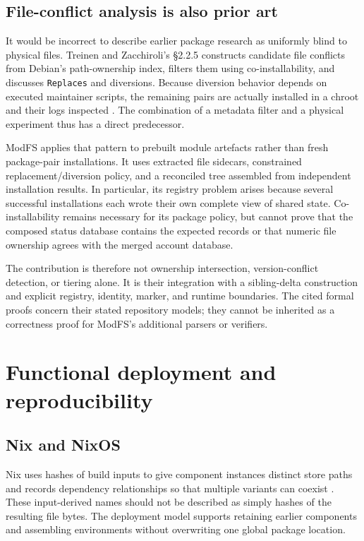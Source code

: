 \subsection{File-conflict analysis is also prior art}

It would be incorrect to describe earlier package research as uniformly blind to physical files. Treinen and Zacchiroli's §2.2.5 constructs candidate file conflicts from Debian's path-ownership index, filters them using co-installability, and discusses \texttt{Replaces} and diversions. Because diversion behavior depends on executed maintainer scripts, the remaining pairs are actually installed in a chroot and their logs inspected \autocite[\S~2.2.5]{treinen2008solving}. The combination of a metadata filter and a physical experiment thus has a direct predecessor.

ModFS applies that pattern to prebuilt module artefacts rather than fresh package-pair installations. It uses extracted file sidecars, constrained replacement/diversion policy, and a reconciled tree assembled from independent installation results. In particular, its registry problem arises because several successful installations each wrote their own complete view of shared state. Co-installability remains necessary for its package policy, but cannot prove that the composed status database contains the expected records or that numeric file ownership agrees with the merged account database.

The contribution is therefore not ownership intersection, version-conflict detection, or tiering alone. It is their integration with a sibling-delta construction and explicit registry, identity, marker, and runtime boundaries. The cited formal proofs concern their stated repository models; they cannot be inherited as a correctness proof for ModFS's additional parsers or verifiers.

\section{Functional deployment and reproducibility}

\subsection{Nix and NixOS}

Nix uses hashes of build inputs to give component instances distinct store paths and records dependency relationships so that multiple variants can coexist \autocite{dolstra2004nix}. These input-derived names should not be described as simply hashes of the resulting file bytes. The deployment model supports retaining earlier components and assembling environments without overwriting one global package location.

